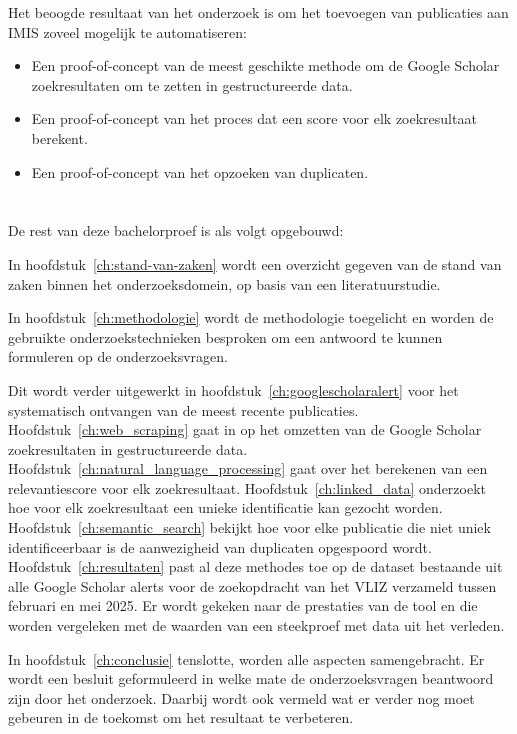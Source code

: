 Het beoogde resultaat van het onderzoek is om het toevoegen van publicaties aan IMIS zoveel mogelijk te automatiseren:
\begin{itemize}
    \item Een proof-of-concept van de meest geschikte methode om de Google Scholar zoekresultaten om te zetten in gestructureerde data.
    \item Een proof-of-concept van het proces dat een score voor elk zoekresultaat berekent.
    \item Een proof-of-concept van het opzoeken van duplicaten.
\end{itemize}

\section{}%
\label{sec:opzet-bachelorproef}


De rest van deze bachelorproef is als volgt opgebouwd:

In hoofdstuk~\ref{ch:stand-van-zaken} wordt een overzicht gegeven van de stand van zaken binnen het onderzoeksdomein, op basis van een literatuurstudie.

In hoofdstuk~\ref{ch:methodologie} wordt de methodologie toegelicht en worden de gebruikte onderzoekstechnieken besproken om een antwoord te kunnen formuleren op de onderzoeksvragen.

Dit wordt verder uitgewerkt in hoofdstuk~\ref{ch:googlescholaralert} voor het systematisch ontvangen van de meest recente publicaties. Hoofdstuk~\ref{ch:web_scraping} gaat in op het omzetten van de Google Scholar zoekresultaten in gestructureerde data. Hoofdstuk~\ref{ch:natural_language_processing} gaat over het berekenen van een relevantiescore voor elk zoekresultaat. Hoofdstuk~\ref{ch:linked_data} onderzoekt hoe voor elk zoekresultaat een unieke identificatie kan gezocht worden. Hoofdstuk~\ref{ch:semantic_search} bekijkt hoe voor elke publicatie die niet uniek identificeerbaar is de aanwezigheid van duplicaten opgespoord wordt. Hoofdstuk~\ref{ch:resultaten} past al deze methodes toe op de dataset bestaande uit alle Google Scholar alerts voor de zoekopdracht van het VLIZ verzameld tussen februari en mei 2025. Er wordt gekeken naar de prestaties van de tool en die worden vergeleken met de waarden van een steekproef met data uit het verleden.


In hoofdstuk~\ref{ch:conclusie} tenslotte, worden alle aspecten samengebracht. Er wordt een besluit geformuleerd in welke mate de onderzoeksvragen beantwoord zijn door het onderzoek. Daarbij wordt ook vermeld wat er verder nog moet gebeuren in de toekomst om het resultaat te verbeteren.